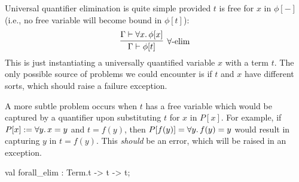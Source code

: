 \begin{node}
Universal quantifier elimination is quite simple provided $t$ is free
for $x$ in $\phi[-]$ (i.e., no free variable will become bound in $\phi[t]$):
\begin{equation}
\vcenter{\infer[\forall\mbox{-elim}]{\Gamma\vdash\phi[t]}{\Gamma\vdash\forall x\ldotp\phi[x]}}
\end{equation}
This is just instantiating a universally quantified variable $x$ with
a term $t$. The only possible source of problems we could encounter is
if $t$ and $x$ have different sorts, which should raise a failure
exception.

A more subtle problem occurs when $t$ has a free variable which would
be captured by a quantifier upon substituting $t$ for $x$ in $P[x]$. 
For example, if $P[x]:=\forall y\ldotp x=y$ and $t=f(y)$, then
$P[f(y)]=\forall y\ldotp f(y)=y$ would result in capturing $y$ in $t=f(y)$.
This \emph{should} be an error, which will be raised in an exception.
\end{node}

\nwenddocs{}\plusendmoddef\nwstartdeflinemarkup{}\nwenddeflinemarkup
val forall_elim : Term.t -> t -> t;
\nwendcode{}\nwdocspar

